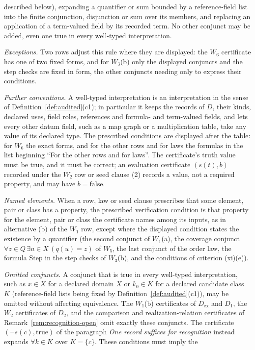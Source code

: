 described below), expanding a quantifier or sum bounded by a reference-field
list into the finite conjunction, disjunction or sum over its members, and
replacing an application of a term-valued field by its recorded term. No other
conjunct may be added, even one true in every well-typed interpretation. \par\emph{Exceptions.} Two rows adjust this rule where they are displayed: the \(W_6\) certificate has one of two fixed forms, and for \(W_3\)(b) only the displayed conjuncts and the step checks are fixed in form, the other conjuncts needing only to express their conditions. \par\emph{Further conventions.} A well-typed interpretation is an interpretation in the sense of Definition~\ref{def:audited}(c1); in particular it
keeps the records of \(D\), their kinds, declared uses, field roles, references
and formula- and term-valued fields, and lets every other datum field, such as
a map graph or a multiplication table, take any value of its declared type.
The prescribed conditions are displayed after the table: for \(W_6\) the exact
forms, and for the other rows and for laws the formulas in the list beginning
``For the other rows and for laws''. The certificate's truth value must be
true, and it must be correct; an evaluation certificate \((s(t),b)\) recorded
under the \(W_2\) row or seed clause (2) records a value, not a required
property, and may have \(b=\mathrm{false}\). \par\emph{Named elements.} When a row, law or seed clause prescribes that some element, pair or class has a property, the prescribed
verification condition is that property for the element, pair or class the
certificate names among its inputs, as in alternative (b) of the \(W_1\) row, except where the displayed condition states the existence by a quantifier (the second conjunct of \(W_1\)(a), the coverage conjunct \(\forall z\in Q\,\exists u\in X\,(q(u)=z)\) of \(W_5\), the last conjunct of the order law, the formula \(\mathrm{Step}\) in the step checks of \(W_3\)(b), and the conditions of criterion (xi)(e)). \par\emph{Omitted conjuncts.} A conjunct that is true in every well-typed interpretation, such as \(x\in X\) for a declared domain \(X\) or \(k_0\in K\) for a declared candidate class \(K\) (reference-field lists being fixed by Definition~\ref{def:audited}(c1)), may be omitted without affecting equivalence. The \(W_1\)(b) certificates of \(D_{\mathrm{ex}}\) and \(D_1\), the \(W_2\) certificates of \(D_2\), and the comparison and realization-relation certificates of Remark~\ref{rem:recognition-open} omit exactly these conjuncts. The certificate \((\neg s(c),\mathrm{true})\) of the paragraph \emph{One record suffices for recognition} instead expands \(\forall k\in K\) over \(K=\{c\}\). These conditions must imply the
